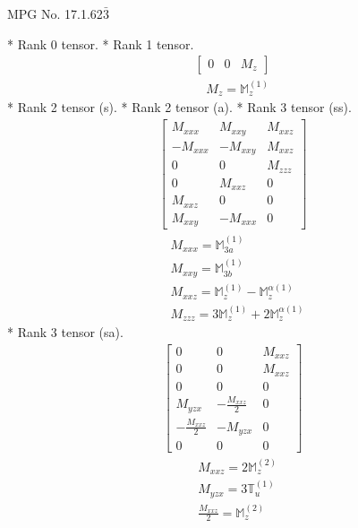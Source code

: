 \documentclass[fleqn,8pt,landscape]{jsarticle}
\begin{document}
\setcounter{MaxMatrixCols}{32}

\renewcommand{\tablename}{Table~}
\renewcommand{\figurename}{Figure~}
\begin{center}
\LARGE
MPG No. 17.1.62\quad$\bar{3}$
\end{center}
* Rank 0 tensor.
* Rank 1 tensor.
\begin{align*}
\begin{bmatrix} 0 & 0 & M_{z} \end{bmatrix}
\end{align*}
\begin{align*}
& M_{z} = \mathbb{M}_{z}^{(1)}
\end{align*}
* Rank 2 tensor (s).
* Rank 2 tensor (a).
* Rank 3 tensor (ss).
\begin{align*}
\begin{bmatrix} M_{xxx} & M_{xxy} & M_{xxz} \\ - M_{xxx} & - M_{xxy} & M_{xxz} \\ 0 & 0 & M_{zzz} \\ 0 & M_{xxz} & 0 \\ M_{xxz} & 0 & 0 \\ M_{xxy} & - M_{xxx} & 0 \end{bmatrix}
\end{align*}
\begin{align*}
& M_{xxx} = \mathbb{M}_{3a}^{(1)} \\
& M_{xxy} = \mathbb{M}_{3b}^{(1)} \\
& M_{xxz} = \mathbb{M}_{z}^{(1)} - \mathbb{M}_{z}^{\alpha(1)} \\
& M_{zzz} = 3 \mathbb{M}_{z}^{(1)} + 2 \mathbb{M}_{z}^{\alpha(1)}
\end{align*}
* Rank 3 tensor (sa).
\begin{align*}
\begin{bmatrix} 0 & 0 & M_{xxz} \\ 0 & 0 & M_{xxz} \\ 0 & 0 & 0 \\ M_{yzx} & - \frac{M_{xxz}}{2} & 0 \\ - \frac{M_{xxz}}{2} & - M_{yzx} & 0 \\ 0 & 0 & 0 \end{bmatrix}
\end{align*}
\begin{align*}
& M_{xxz} = 2 \mathbb{M}_{z}^{(2)} \\
& M_{yzx} = 3 \mathbb{T}_{u}^{(1)} \\
& \frac{M_{xxz}}{2} = \mathbb{M}_{z}^{(2)}
\end{align*}
\end{document}
